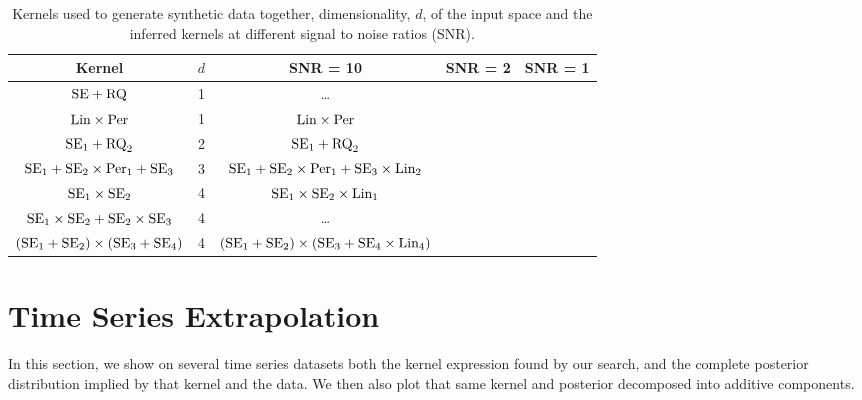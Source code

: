 \documentclass[twoside]{article}
\begin{document}
\begin{table}[ht!]
\caption{{\small
Kernels used to generate synthetic data together, dimensionality, $d$, of the input space and the inferred kernels at different signal to noise ratios (SNR).
}}
\label{tbl:synthetic}
\begin{center}
\begin{tabular}{c c | c c c}
Kernel & $d$ & SNR = 10 & SNR = 2 & SNR = 1 \\
\hline
$\textrm{SE} + \textrm{RQ}$                               & 1 & \ldots \\
$\textrm{Lin} \times \textrm{Per}$                        & 1 & $\textrm{Lin} \times \textrm{Per}$ \\
$\textrm{SE}_1 + \textrm{RQ}_2$                           & 2 & $\textrm{SE}_1 + \textrm{RQ}_2$ \\
$\textrm{SE}_1 + \textrm{SE}_2 \times \textrm{Per}_1 + \textrm{SE}_3$     & 3 & $\textrm{SE}_1 + \textrm{SE}_2 \times \textrm{Per}_1 + \textrm{SE}_3 \times \textrm{Lin}_2$ \\
$\textrm{SE}_1 \times \textrm{SE}_2$                      & 4 & $\textrm{SE}_1 \times \textrm{SE}_2 \times \textrm{Lin}_1$ \\
$\textrm{SE}_1 \times \textrm{SE}_2 + \textrm{SE}_2 \times \textrm{SE}_3$ & 4 & \ldots\\
$(\textrm{SE}_1 + \textrm{SE}_2) \times (\textrm{SE}_3 + \textrm{SE}_4)$  & 4 & $(\textrm{SE}_1 + \textrm{SE}_2) \times (\textrm{SE}_3 + \textrm{SE}_4\times\textrm{Lin}_4)$\\
\end{tabular}
\end{center}
\end{table}

\section{Time Series Extrapolation}

In this section, we show on several time series datasets both the kernel expression found by our search, and the complete \gp{} posterior distribution implied by that kernel and the data.  
We then also plot that same kernel and posterior decomposed into additive components.


\end{document}
